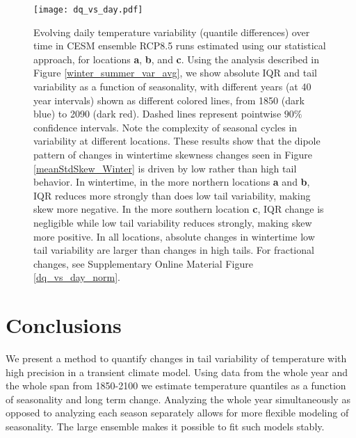 \documentclass{ametsoc}
\newcommand\bigfigwidth{\textwidth}
\begin{document}
\begin{figure*}[ht]
\centerline{\texttt{[image: dq\_vs\_day.pdf]}}
\caption{\small{Evolving daily temperature variability (quantile differences) over time in CESM ensemble RCP8.5 runs estimated using our statistical approach, for locations \textbf{a}, \textbf{b}, and \textbf{c}. Using the analysis described in Figure \ref{winter_summer_var_avg},
 we show absolute IQR and tail variability as a function of seasonality, with different years (at 40 year intervals) shown as different colored lines, %
from 1850 (dark blue) to 2090 (dark red).
Dashed lines represent pointwise $90\%$ confidence intervals. Note the complexity of seasonal cycles in variability at different locations. These results show that the dipole pattern of changes in wintertime skewness changes seen in Figure \ref{meanStdSkew_Winter} %
is driven by low rather than high tail behavior. In wintertime, in the more northern locations \textbf{a} and \textbf{b}, IQR reduces more strongly than does low tail variability, making skew more negative. In the more southern location \textbf{c}, IQR change is negligible while low tail variability reduces strongly, making skew more positive. In all locations, absolute changes in wintertime low tail variability are larger than changes in high tails. For fractional changes, see Supplementary Online Material Figure \ref{dq_vs_day_norm}. }}
\label{dq_vs_day}
\end{figure*}


\section{Conclusions}
\label{sec:conclusions}

We present a method to quantify changes in tail variability of temperature with high precision in a transient climate model. Using data from the whole year and the whole span from 1850-2100 we estimate temperature quantiles as a function of seasonality and long term change. Analyzing the whole year simultaneously as opposed to analyzing each season separately allows for more flexible modeling of seasonality. The large ensemble makes it possible to fit such models stably.
\end{document}
